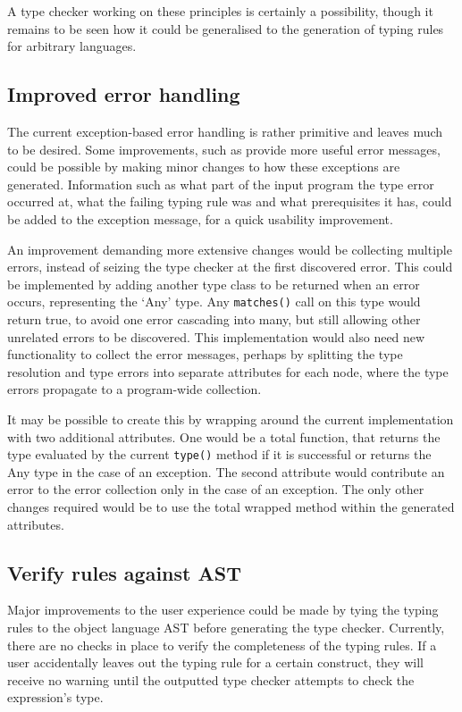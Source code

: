 \documentclass[nofilelist]{cslthse-msc}
\begin{document}

A type checker working on these principles is certainly a possibility, though it remains to be seen how it could be generalised to the generation of typing rules for arbitrary languages.

\subsection{Improved error handling}\label{improvederrorhandling}
The current exception-based error handling is rather primitive and leaves much to be desired.
Some improvements, such as provide more useful error messages, could be possible by making minor changes to how these exceptions are generated.
Information such as what part of the input program the type error occurred at, what the failing typing rule was and what prerequisites it has, could be added to the exception message, for a quick usability improvement.

An improvement demanding more extensive changes would be collecting multiple errors, instead of seizing the type checker at the first discovered error.
This could be implemented by adding another type class to be returned when an error occurs, representing the `Any' type.
Any \lstinline{matches()} call on this type would return true, to avoid one error cascading into many, but still allowing other unrelated errors to be discovered.
This implementation would also need new functionality to collect the error messages, perhaps by splitting the type resolution and type errors into separate attributes for each node, where the type errors propagate to a program-wide collection.

It may be possible to create this by wrapping around the current implementation with two additional attributes.
One would be a total function, that returns the type evaluated by the current \lstinline{type()} method if it is successful or returns the Any type in the case of an exception.
The second attribute would contribute an error to the error collection only in the case of an exception.
The only other changes required would be to use the total wrapped method within the generated attributes.


\subsection{Verify rules against AST}
Major improvements to the user experience could be made by tying the typing rules to the object language AST before generating the type checker.
Currently, there are no checks in place to verify the completeness of the typing rules.
If a user accidentally leaves out the typing rule for a certain construct, they will receive no warning until the outputted type checker attempts to check the expression's type.
\end{document}
